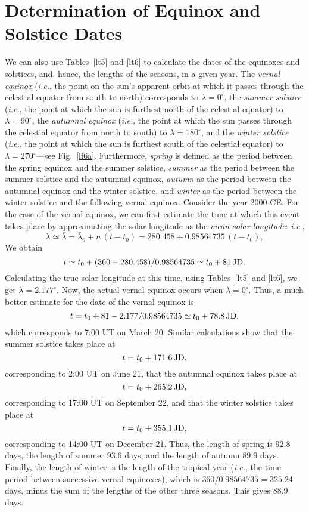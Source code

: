 \section{Determination of Equinox and Solstice Dates}
We can also use Tables~\ref{lt5} and \ref{lt6} to calculate the dates of the equinoxes and solstices,
and, hence, the lengths of the seasons, in a given year. The {\em vernal equinox}\/ ({\em i.e.}, the point on the sun's apparent orbit at which it passes through the celestial equator
from south to north)
corresponds to $\lambda=0^\circ$, the {\em summer solstice}\/ ({\em i.e.}, the
point at which the sun is furthest north of the celestial equator) to $\lambda=90^\circ$, the {\em autumnal equinox}\/ ({\em i.e.}, the point at which the
sun passes through the celestial equator from north to south) to $\lambda = 180^\circ$, and the
{\em winter solstice}\/ ({\em i.e.}, the point at which the sun is furthest south of the celestial equator) to $\lambda = 270^\circ$---see Fig.~\ref{lf6a}. Furthermore, {\em spring}\/ is defined as the period between the spring
equinox and the summer solstice, {\em summer}\/ as the period between the summer solstice and
the autumnal equinox, {\em autumn}\/ as the period between the autumnal equinox and the
winter solstice, and {\em winter}\/ as the period between the winter solstice and the following
vernal equinox. Consider the year 2000 CE.
For the case of the vernal equinox, we can
 first estimate the
 time at which this event takes place by approximating the solar
 longitude as the {\em mean
solar longitude}: {\em i.e.}, 
$$
\lambda\simeq \bar{\lambda} = \bar{\lambda}_0 + n\,(t-t_0)
= 280.458 +  0.98564735\,(t-t_0),
$$
 We obtain 
$$
t \simeq t_0+(360-280.458)/0.98564735 \simeq t_0+81\,{\rm JD}.
$$ 
Calculating the true solar longitude at this time, using Tables~\ref{lt5} and \ref{lt6}, we get  
$\lambda = 2.177^\circ.$ Now, the actual vernal equinox occurs
when $\lambda=0^\circ$.
Thus, a much better estimate for the date of the vernal equinox
is
$$
t = t_0 + 81 -2.177/0.98564735 \simeq t_0 + 78.8\,{\rm JD},
$$
 which
corresponds to 7:00 UT on March 20. Similar calculations show that the summer solstice takes place at 
$$
t = t_0+ 171.6\, {\rm JD},
$$
corresponding to 2:00 UT on June 21, that the autumnal equinox
takes place at 
$$
t = t_0+265.2\,{\rm JD},
$$
corresponding to 17:00 UT
on September 22, and that the winter solstice takes place at
$$
t =t_0+355.1\, {\rm JD},
$$
corresponding to 14:00 UT on December 21. 
Thus, the length of spring is $92.8$ days,
the length of summer $93.6$ days,
and the length of autumn  $89.9$ days.
Finally, the length of winter is the length
of the tropical year ({\em i.e.}, the time period between successive vernal equinoxes), which is $360/0.98564735 = 325.24$ days, minus the sum of the lengths of the
other three seasons. This gives $88.9$ days. 

